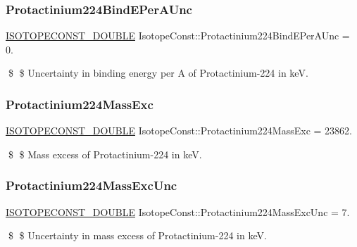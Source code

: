 \subsubsection{\texorpdfstring{Protactinium224\+Bind\+E\+Per\+A\+Unc}{Protactinium224BindEPerAUnc}}
{\footnotesize\ttfamily \mbox{\hyperlink{group___isotope_const-_macros_ga8f45a7272ce02c0b4c65c44636ed719a}{I\+S\+O\+T\+O\+P\+E\+C\+O\+N\+S\+T\+\_\+\+D\+O\+U\+B\+LE}} Isotope\+Const\+::\+Protactinium224\+Bind\+E\+Per\+A\+Unc = 0.}

\$ \$ Uncertainty in binding energy per A of Protactinium-\/224 in keV. \mbox{\label{group___isotope_const-_protactinium-_pa224_gaedc112ba6a41feafeb1f518625b65fb5}} 
\subsubsection{\texorpdfstring{Protactinium224\+Mass\+Exc}{Protactinium224MassExc}}
{\footnotesize\ttfamily \mbox{\hyperlink{group___isotope_const-_macros_ga8f45a7272ce02c0b4c65c44636ed719a}{I\+S\+O\+T\+O\+P\+E\+C\+O\+N\+S\+T\+\_\+\+D\+O\+U\+B\+LE}} Isotope\+Const\+::\+Protactinium224\+Mass\+Exc = 23862.}

\$ \$ Mass excess of Protactinium-\/224 in keV. \mbox{\label{group___isotope_const-_protactinium-_pa224_gab0fce0161c5413e6daa33f2158000fe0}} 
\subsubsection{\texorpdfstring{Protactinium224\+Mass\+Exc\+Unc}{Protactinium224MassExcUnc}}
{\footnotesize\ttfamily \mbox{\hyperlink{group___isotope_const-_macros_ga8f45a7272ce02c0b4c65c44636ed719a}{I\+S\+O\+T\+O\+P\+E\+C\+O\+N\+S\+T\+\_\+\+D\+O\+U\+B\+LE}} Isotope\+Const\+::\+Protactinium224\+Mass\+Exc\+Unc = 7.}

\$ \$ Uncertainty in mass excess of Protactinium-\/224 in keV. \mbox{\label{group___isotope_const-_protactinium-_pa224_ga44f7f4621ca6fdac22ab6440d059cf0a}} 
